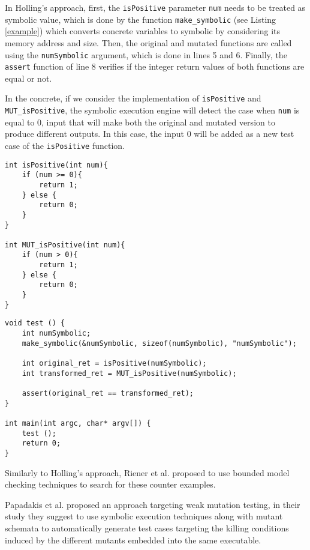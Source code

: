 In Holling's approach, first, the \texttt{isPositive} parameter \texttt{num} needs to be treated as symbolic value, which is done by the function \texttt{make\_symbolic} (see Listing \ref{example}) which converts concrete variables to symbolic by considering its memory address and size. Then, the original and mutated functions are called using the \texttt{numSymbolic} argument, which is done in lines 5 and 6. Finally, the \texttt{assert} function of line 8 verifies if the integer return values of both functions are equal or not.

In the concrete, if we consider the implementation of \texttt{isPositive} and \texttt{MUT\_isPositive}, the symbolic execution engine will detect the case when \texttt{num} is equal to 0, input that will make both the original and mutated version to produce different outputs. In this case, the input 0 will be added as a new test case of the \texttt{isPositive} function.

\begin{lstlisting}[style=CStyle, caption=isPositive and MUT\_isPositive functions, label=function]
int isPositive(int num){
	if (num >= 0){
		return 1;
	} else {
		return 0;
	}
}

int MUT_isPositive(int num){
	if (num > 0){
		return 1;
	} else {
		return 0;
	}
}

\end{lstlisting}

\begin{lstlisting}[style=CStyle, caption=Holling's approach for test case generation., label=example]
void test () { 
	int numSymbolic; 
	make_symbolic(&numSymbolic, sizeof(numSymbolic), "numSymbolic"); 
 	
 	int original_ret = isPositive(numSymbolic); 
	int transformed_ret = MUT_isPositive(numSymbolic); 
 
	assert(original_ret == transformed_ret); 
} 
 
int main(int argc, char* argv[]) { 
	test (); 
	return 0; 
}
\end{lstlisting}

Similarly to Holling's approach, Riener et al. \cite{riener2011test} proposed to use bounded model checking techniques to search for these counter examples.

Papadakis et al. \cite{papadakis2011automatically, papadakis2010towards} proposed an approach targeting weak mutation testing, in their study they suggest to use symbolic execution techniques along with mutant schemata to automatically generate test cases targeting the killing conditions induced by the different mutants embedded into the same executable.

